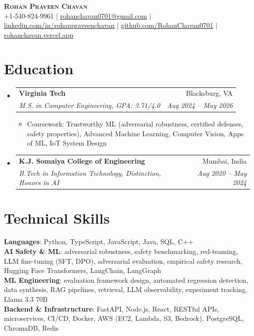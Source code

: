 \documentclass[letterpaper,10pt]{article}
\makeatletter
\newcommand{\resumeItem}[1]{\item\small{#1 \vspace{-2.5pt}}}
\newcommand{\resumeSubheading}[4]{
  \vspace{-2pt}\item
    \begin{tabular*}{0.97\textwidth}[t]{l@{\extracolsep{\fill}}r}
      \textbf{#1} & #2 \\
      \textit{\small#3} & \textit{\small #4} \\
    \end{tabular*}\vspace{-7pt}
}
\newcommand{\resumeSubHeadingListStart}{\begin{itemize}[leftmargin=0.15in, label={}]}
\newcommand{\resumeSubHeadingListEnd}{\end{itemize}}
\newcommand{\resumeItemListStart}{\begin{itemize}}
\newcommand{\resumeItemListEnd}{\end{itemize}\vspace{-5pt}}
\makeatother
\begin{document}
\begin{center}
    \textbf{\Huge \scshape Rohan Praveen Chavan} \\ \vspace{2pt}
    \small +1-540-824-9961 $|$
    \href{mailto:rohanchavan0701@gmail.com}{\underline{rohanchavan0701@gmail.com}} $|$
    \href{https://linkedin.com/in/rohanpraveenchavan}{\underline{linkedin.com/in/rohanpraveenchavan}} $|$
    \href{https://github.com/RohanChavan0701}{\underline{github.com/RohanChavan0701}} $|$
    \href{https://rohanchavan.vercel.app}{\underline{rohanchavan.vercel.app}}
\end{center}

\section{Education}
\resumeSubHeadingListStart
    \resumeSubheading
      {Virginia Tech}{Blacksburg, VA}
      {M.S. in Computer Engineering, GPA: 3.71/4.0}{Aug 2024 -- May 2026}
      \resumeItemListStart
        \resumeItem{Coursework: Trustworthy ML (adversarial robustness, certified defenses, safety properties),
          Advanced Machine Learning, Computer Vision, Apps of ML, IoT System Design}
      \resumeItemListEnd
    \resumeSubheading
      {K.J. Somaiya College of Engineering}{Mumbai, India}
      {B.Tech in Information Technology, Distinction, Honors in AI}{Aug 2020 -- May 2024}
\resumeSubHeadingListEnd

\section{Technical Skills}
\begin{itemize}[leftmargin=0.15in, label={}]
    \small{\item{
     \textbf{Languages}{: Python, TypeScript, JavaScript, Java, SQL, C++} \\
     \textbf{AI Safety \& ML}{: adversarial robustness, safety benchmarking, red-teaming, LLM fine-tuning
       (SFT, DPO), adversarial evaluation, empirical safety research, Hugging Face Transformers,
       LangChain, LangGraph} \\
     \textbf{ML Engineering}{: evaluation framework design, automated regression detection, data synthesis,
       RAG pipelines, retrieval, LLM observability, experiment tracking, Llama 3.3 70B} \\
     \textbf{Backend \& Infrastructure}{: FastAPI, Node.js, React, RESTful APIs, microservices,
       CI/CD, Docker, AWS (EC2, Lambda, S3, Bedrock), PostgreSQL, ChromaDB, Redis}
    }}
\end{itemize}
\end{document}
